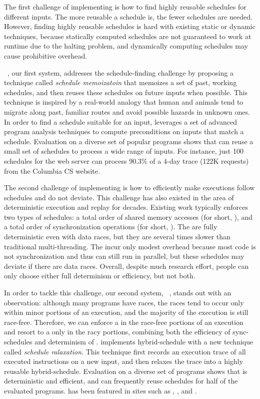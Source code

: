 The first challenge of implementing \smt is how to find highly reusable schedules for different inputs. The more reusable a schedule is, the fewer schedules are needed. However, finding highly reusable schedules is hard with existing static or dynamic techniques, because statically computed schedules are not guaranteed to work at runtime due to the halting problem, and dynamically computing schedules may cause prohibitive overhead.

\tern~\cite{cui:tern:osdi10}, our first \smt system, addresses the schedule-finding challenge by proposing a technique called \emph{schedule memoizatoin} that memoizes a set of past, working schedules, and then 
reuses these schedules on future inputs when possible. This technique is inspired
by a real-world analogy that human and animals tend to migrate along past, familiar routes
and avoid possible hazards in unknown ones. In order to find a schedule 
suitable for an input, \tern leverages a set of advanced program 
analysis techniques to compute preconditions on inputs that match a schedule. 
Evaluation on a diverse set of popular programs shows that \tern can
reuse a small set of schedules to process a wide range of inputs. For 
instance, just 100 schedules for the \apache web server can process 90.3\% of a 4-day 
trace (122K requests) from the Columbia CS website.

The second challenge of implementing \smt is how to efficiently make executions follow schedules 
and do not deviate. This challenge has also existed in the area of deterministic execution and replay for decades. Existing work typically enforces two types of schedules: a total order of shared memory accesses (for short, \memsched), and a total order of synchronization operations (for 
short, \syncsched). The \memscheds are fully deterministic even with 
data races, but they are several times slower than traditional multi-threading.
The \syncscheds incur only modest overhead because most code is 
not synchronization and thus can still run in parallel, but these schedules may deviate if there are data races. Overall, despite much research effort, people can only choose either full determinism or efficiency, but not both.

In order to tackle this challenge, our second \smt system, \peregrine~\cite{peregrine}, 
stands out with an observation: although many programs have races, the 
races tend to occur only within minor portions of an execution, and the 
majority of the execution is still race-free. Therefore, we can enforce a \syncscheds
in the race-free portions of an execution and resort to a \memsched only in the racy portions,
combining both the efficiency of sync-schedules and determinism of \memscheds. 
\peregrine implements hybrid-schedule with
a new technique called \emph{schedule ralaxation}. This technique first records an execution 
trace of all executed instructions on a new input, and then relaxes 
the trace into a highly reusable hybrid-schedule. Evaluation on a diverse set of programs shows that 
\peregrine is deterministic and efficient, and can frequently reuse schedules 
for half of the evaluated programs. \peregrine has been featured in sites such 
as \acmtechnews, \tgdaily, and \physorg.

